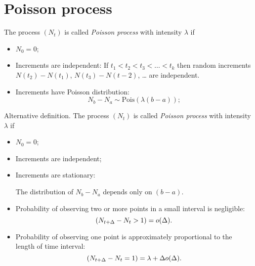 \documentclass[12pt, a4paper]{article}
\let\P\relax
\DeclareMathOperator{\P}{\mathbb{P}}
\newcommand{\dPois}{\mathrm{Pois}}
\begin{document}
  

\section{Poisson process}

\begin{leftbar}
  The process $(N_t)$ is called \emph{Poisson process} with intensity $\lambda$ if 
  \begin{itemize}
    \item $N_0 = 0$;
    \item Increments are independent:
    If $t_1 < t_2 < t_3 < \dots < t_k$ then random increments $N(t_2) - N(t_1)$, $N(t_3) - N(t-2)$, \dots{ } are independent.
    \item Increments have Poisson distribution:
    \[
    N_b - N_a \sim \dPois(\lambda (b-a));
    \]
  \end{itemize}
  Alternative definition. The process $(N_t)$ is called \emph{Poisson process} with intensity $\lambda$ if 
  \begin{itemize}
    \item $N_0 = 0$;
    \item Increments are independent;
    \item Increments are stationary:
    
    The distribution of $N_b - N_a$ depends only on $(b - a)$.
    \item Probability of observing two or more points in a small interval is negligible:
    \[
    \P(N_{t + \Delta} - N_t > 1) = o(\Delta).
    \]
    \item Probability of observing one point is approximately proportional to the length of time interval:
    \[
      \P(N_{t + \Delta} - N_t = 1) = \lambda + \Delta o(\Delta).
    \]  
  \end{itemize}
\end{leftbar}
\end{document}
